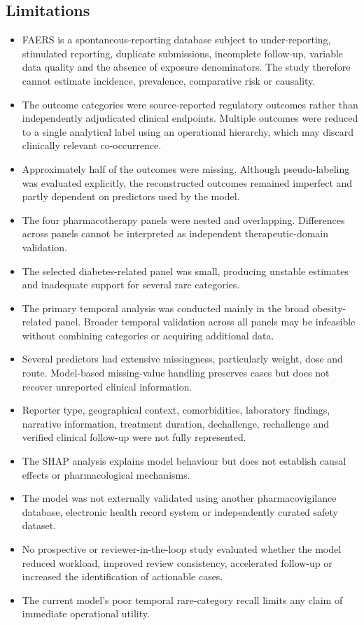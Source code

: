 \documentclass[10pt]{article}
\begin{document}
\subsection{Limitations}
\begin{itemize}
\item FAERS is a spontaneous-reporting database subject to under-reporting, stimulated reporting, duplicate submissions, incomplete follow-up, variable data quality and the absence of exposure denominators. The study therefore cannot estimate incidence, prevalence, comparative risk or causality.
\item The outcome categories were source-reported regulatory outcomes rather than independently adjudicated clinical endpoints. Multiple outcomes were reduced to a single analytical label using an operational hierarchy, which may discard clinically relevant co-occurrence.
\item Approximately half of the outcomes were missing. Although pseudo-labeling was evaluated explicitly, the reconstructed outcomes remained imperfect and partly dependent on predictors used by the model.
\item The four pharmacotherapy panels were nested and overlapping. Differences across panels cannot be interpreted as independent therapeutic-domain validation.
\item The selected diabetes-related panel was small, producing unstable estimates and inadequate support for several rare categories.
\item The primary temporal analysis was conducted mainly in the broad obesity-related panel. Broader temporal validation across all panels may be infeasible without combining categories or acquiring additional data.
\item Several predictors had extensive missingness, particularly weight, dose and route. Model-based missing-value handling preserves cases but does not recover unreported clinical information.
\item Reporter type, geographical context, comorbidities, laboratory findings, narrative information, treatment duration, dechallenge, rechallenge and verified clinical follow-up were not fully represented.
\item The SHAP analysis explains model behaviour but does not establish causal effects or pharmacological mechanisms.
\item The model was not externally validated using another pharmacovigilance database, electronic health record system or independently curated safety dataset.
\item No prospective or reviewer-in-the-loop study evaluated whether the model reduced workload, improved review consistency, accelerated follow-up or increased the identification of actionable cases.
\item The current model's poor temporal rare-category recall limits any claim of immediate operational utility.
\end{itemize}
\end{document}
